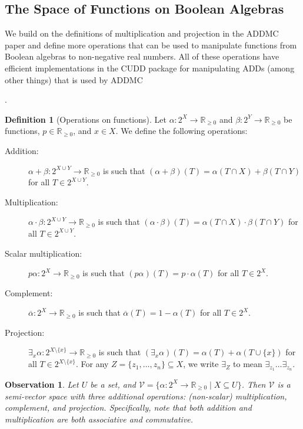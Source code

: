 \documentclass{article}
\newtheorem{observation}{Observation}
\theoremstyle{definition}
\newtheorem{definition}{Definition}
\theoremstyle{remark}
\begin{document}
\subsection{The Space of Functions on Boolean Algebras}

We build on the definitions of multiplication and projection in the ADDMC paper
\cite{DBLP:conf/aaai/DudekPV20} and define more operations that can be used to
manipulate functions from Boolean algebras to non-negative real numbers. All of
these operations have efficient implementations in the CUDD
\cite{somenzi1998cudd} package for manipulating ADDs (among other things) that
is used by ADDMC {\cite{DBLP:conf/aaai/DudekPV20}.

\begin{definition}[Operations on functions]
  Let $\alpha\colon 2^X \to \mathbb{R}_{\ge 0}$ and $\beta\colon 2^Y \to
  \mathbb{R}_{\ge 0}$ be functions, $p \in \mathbb{R}_{\ge 0}$, and $x \in X$.
  We define the following operations:
  \begin{description}
  \item[Addition:] $\alpha + \beta\colon 2^{X \cup Y} \to \mathbb{R}_{\ge 0}$ is
    such that $(\alpha + \beta)(T) = \alpha(T \cap X) + \beta(T \cap Y)$ for all
    $T \in 2^{X \cup Y}$.
  \item[Multiplication:] $\alpha \cdot \beta\colon 2^{X \cup Y} \to
    \mathbb{R}_{\ge 0}$ is such that $(\alpha \cdot \beta)(T) = \alpha(T \cap X)
    \cdot \beta(T \cap Y)$ for all $T \in 2^{X \cup Y}$.
  \item[Scalar multiplication:] $p\alpha\colon 2^X \to \mathbb{R}_{\ge 0}$ is
    such that $(p\alpha)(T) = p \cdot \alpha(T)$ for all $T \in 2^X$.
  \item[Complement:] $\overline{\alpha}\colon 2^X \to \mathbb{R}_{\ge 0}$ is
    such that $\overline{\alpha}(T) = 1 - \alpha(T)$ for all $T \in 2^X$.
  \item[Projection:] $\exists_x\alpha\colon 2^{X \setminus \{ x \}} \to
    \mathbb{R}_{\ge 0}$ is such that $(\exists_x\alpha)(T) = \alpha(T) +
    \alpha(T \cup \{ x \})$ for all $T \in 2^{X \setminus \{x \}}$. For any $Z =
    \{ z_1, \dots, z_n \} \subseteq X$, we write $\exists_Z$ to mean
    $\exists_{z_1}\dots\exists_{z_n}$.
  \end{description}
\end{definition}

\begin{observation}
  Let $U$ be a set, and $\mathcal{V} = \{ \alpha\colon 2^X \to \mathbb{R}_{\ge 0}
  \mid X \subseteq U \}$. Then $\mathcal{V}$ is a semi-vector space with three
  additional operations: (non-scalar) multiplication, complement, and projection.
  Specifically, note that both addition and multiplication are both associative
  and commutative.
\end{observation}

}
\end{document}
